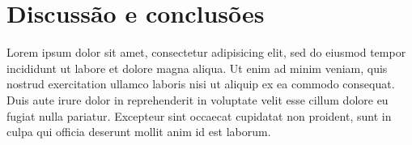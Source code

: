 \documentclass[12pt]{article}
\begin{document}
\section{Discussão e conclusões} \label{sec:conclusions}

Lorem ipsum dolor sit amet, consectetur adipisicing elit, sed do eiusmod tempor incididunt ut labore et dolore magna aliqua. Ut enim ad minim veniam, quis nostrud exercitation ullamco laboris nisi ut aliquip ex ea commodo consequat. Duis aute irure dolor in reprehenderit in voluptate velit esse cillum dolore eu fugiat nulla pariatur. Excepteur sint occaecat cupidatat non proident, sunt in culpa qui officia deserunt mollit anim id est laborum.



\end{document}
